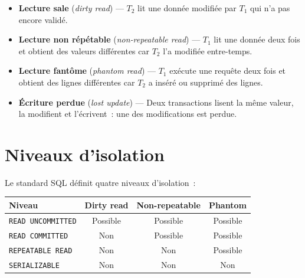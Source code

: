 \begin{definition}
\begin{itemize}
  \item \textbf{Lecture sale} (\emph{dirty read}) --- $T_2$ lit une donn\'ee
        modifi\'ee par $T_1$ qui n'a pas encore valid\'e.
  \item \textbf{Lecture non r\'ep\'etable} (\emph{non-repeatable read}) ---
        $T_1$ lit une donn\'ee deux fois et obtient des valeurs diff\'erentes
        car $T_2$ l'a modifi\'ee entre-temps.
  \item \textbf{Lecture fant\^ome} (\emph{phantom read}) --- $T_1$ ex\'ecute
        une requ\^ete deux fois et obtient des lignes diff\'erentes car $T_2$
        a ins\'er\'e ou supprim\'e des lignes.
  \item \textbf{\'Ecriture perdue} (\emph{lost update}) --- Deux transactions
        lisent la m\^eme valeur, la modifient et l'\'ecrivent~: une des
        modifications est perdue.
\end{itemize}
\end{definition}

\section{Niveaux d'isolation}

\begin{definition}
Le standard SQL d\'efinit quatre niveaux d'isolation~:
\begin{center}
\begin{tabular}{lccc}
\hline
\textbf{Niveau} & \textbf{Dirty read} & \textbf{Non-repeatable} & \textbf{Phantom} \\
\hline
\texttt{READ UNCOMMITTED} & Possible & Possible & Possible \\
\texttt{READ COMMITTED}   & Non      & Possible & Possible \\
\texttt{REPEATABLE READ}  & Non      & Non      & Possible \\
\texttt{SERIALIZABLE}     & Non      & Non      & Non \\
\hline
\end{tabular}
\end{center}
\end{definition}

